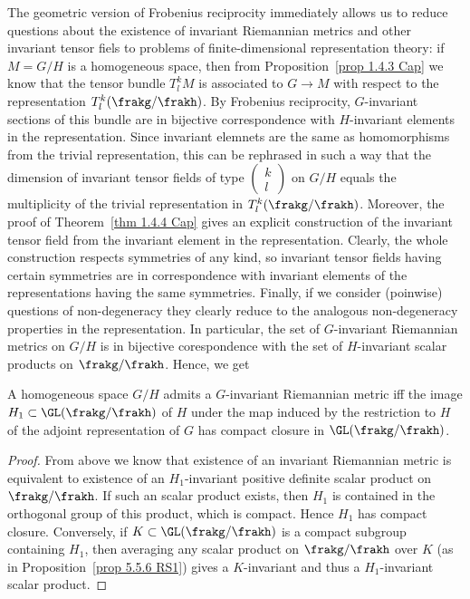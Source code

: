The geometric version of Frobenius reciprocity immediately allows us to reduce questions about the existence of invariant Riemannian metrics and other invariant tensor fiels to problems of finite-dimensional representation theory: if $M=G\slash H$ is a homogeneous space, then from Proposition~\ref{prop 1.4.3 Cap} we know that the tensor bundle $T^k_lM$ is associated to $G\to M$ with respect to the representation $T^k_l(\frakg\slash \frakh)$. By Frobenius reciprocity, $G$-invariant sections of this bundle are in bijective correspondence with $H$-invariant elements in the representation. Since invariant elemnets are the same as homomorphisms from the trivial representation, this can be rephrased in such a way that the dimension of invariant tensor fields of type $\left(\begin{smallmatrix}k\\l\end{smallmatrix}\right)$
on $G\slash H$ equals the multiplicity of the trivial representation in $T^k_l(\frakg\slash\frakh)$. Moreover, the proof of Theorem~\ref{thm 1.4.4 Cap} gives an explicit construction of the invariant tensor field from the invariant element in the representation. Clearly, the whole construction respects symmetries of any kind, so invariant tensor fields having certain symmetries are in correspondence with invariant elements of the representations having the same symmetries. Finally, if we consider (poinwise) questions of non-degeneracy they clearly reduce to the analogous non-degeneracy properties in the representation. In particular, the set of $G$-invariant Riemannian metrics on $G\slash H$ is in bijective corespondence with the set of $H$-invariant scalar products on $\frakg\slash\frakh$. Hence, we get
\begin{cor}
    A homogeneous space $G\slash H$ admits a $G$-invariant Riemannian metric iff the image $H_1\subset \GL(\frakg\slash\frakh)$ of $H$ under the map induced by the restriction to $H$ of the adjoint representation of $G$ has compact closure in $\GL(\frakg\slash\frakh)$.
\end{cor}
\begin{proof}
    From above we know that existence of an invariant Riemannian metric is equivalent to existence of an $H_1$-invariant positive definite scalar product on $\frakg\slash\frakh$. If such an scalar product exists, then $H_1$ is contained in the orthogonal group of this  product, which is compact. Hence $H_1$ has compact closure. Conversely, if $K\subset \GL(\frakg\slash\frakh)$ is a compact subgroup containing $H_1$, then averaging any scalar product on $\frakg\slash\frakh$ over $K$ (as in Proposition~\ref{prop 5.5.6 RS1}) gives a $K$-invariant and thus a $H_1$-invariant scalar product.
\end{proof}

